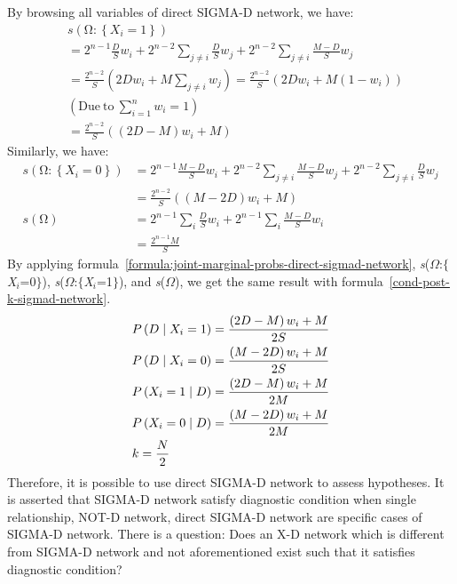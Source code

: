 \documentclass{article}
\numberwithin{equation}{section}
\numberwithin{figure}{section}
\numberwithin{table}{section}
\begin{document}
By browsing all variables of direct SIGMA-D network, we have:
\begin{align*}
&s\left(\mathrm{\Omega }\mathrm{:}\left\{X_i=1\right\}\right)\\
&=2^{n-1}\frac{D}{S}w_i+2^{n-2}\sum_{j\neq i}{\frac{D}{S}w_j}+2^{n-2}\sum_{j\neq i}{\frac{M-D}{S}w_j}\\
&=\frac{2^{n-2}}{S}\left(2Dw_i+M\sum_{j\neq i}{w_j}\right)=\frac{2^{n-2}}{S}\left(2Dw_i+M\left(1-w_i\right)\right)\\
&\left(\mathrm{Due\ to\ }\sum^n_{i=1}{w_i}=1\right)\\
&=\frac{2^{n-2}}{S}\left(\left(2D-M\right)w_i+M\right)
\end{align*}
Similarly, we have:
\begin{align*}
s\left(\mathrm{\Omega }\mathrm{:}\left\{X_i=0\right\}\right)&=2^{n-1}\frac{M-D}{S}w_i+2^{n-2}\sum_{j\neq i}{\frac{M-D}{S}w_j}+2^{n-2}\sum_{j\neq i}{\frac{D}{S}w_j}\\
&=\frac{2^{n-2}}{S}\left(\left(M-2D\right)w_i+M\right)\\
s\left(\mathrm{\Omega }\right)&=2^{n-1}\sum_i{\frac{D}{S}w_i}+2^{n-1}\sum_i{\frac{M-D}{S}w_i}\\
&=\frac{2^{n-1}M}{S}
\end{align*}
By applying formula~\ref{formula:joint-marginal-probs-direct-sigmad-network}, \textit{s}($\Omega$:$\{$\textit{X${}_{i}$}=0$\}$), \textit{s}($\Omega$:$\{$\textit{X${}_{i}$}=1$\}$), and \textit{s}($\Omega$), we get the same result with formula~\ref{cond-post-k-sigmad-network}.
\begin{align*}
&P\left(D\mathrel{\left|\vphantom{D X_i=1}\right.\kern-\nulldelimiterspace}X_i=1\right)=\frac{\left(2D-M\right)w_i+M}{2S}\\
&P\left(D\mathrel{\left|\vphantom{D X_i=0}\right.\kern-\nulldelimiterspace}X_i=0\right)=\frac{\left(M-2D\right)w_i+M}{2S}\\
&P\left(X_i=1\mathrel{\left|\vphantom{X_i=1 D}\right.\kern-\nulldelimiterspace}D\right)=\frac{\left(2D-M\right)w_i+M}{2M}\\
&P\left(X_i=0\mathrel{\left|\vphantom{X_i=0 D}\right.\kern-\nulldelimiterspace}D\right)=\frac{\left(M-2D\right)w_i+M}{2M}\\
&k=\frac{N}{2}
\end{align*}
Therefore, it is possible to use direct SIGMA-D network to assess hypotheses. It is asserted that SIGMA-D network satisfy diagnostic condition when single relationship, NOT-D network, direct SIGMA-D network are specific cases of SIGMA-D network. There is a question: Does an X-D network which is different from SIGMA-D network and not aforementioned exist such that it satisfies diagnostic condition?
\end{document}
